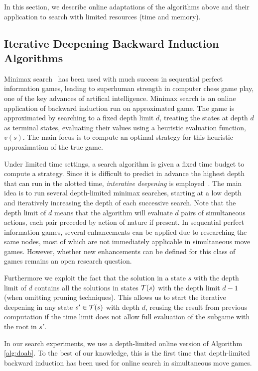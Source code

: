 
In this section, we describe online adaptations of the algorithms above and their application 
to search with limited resources (time and memory). 

\subsection{Iterative Deepening Backward Induction Algorithms} \label{sec:idbi}

Minimax search~\cite{AIbook} has been used with much success in sequential perfect information games, 
leading to superhuman strength in computer chess game play, one of the key advances of artifical 
intelligence. 
Minimax search is an online application of backward induction run on approximated game. 
The game is approximated by searching to a fixed depth limit $d$, treating the states at depth $d$
as terminal states, evaluating their values using a heuristic evaluation function, $v(s)$. 
The main focus is to compute an optimal strategy for this heuristic approximation of the true game. 

Under limited time settings, a search algorithm is given a fixed time budget to compute a strategy. 
Since it is difficult to predict in advance the highest depth that can run in the alotted time, 
{\it interative deepening} is employed~\cite{Marsland83}. The main idea is to run several depth-limited 
minimax searches, starting at a low depth and iteratively increasing the depth of each successive search. Note that the depth limit of $d$ means that the algorithm will evaluate $d$ pairs of simultaneous actions, each pair preceded by action of nature if present.  
In sequential perfect information games, several enhancements can be applied due to researching the same 
nodes, most of which are not immediately applicable in simultaneous move games. However, whether new 
enhancements can be defined for this class of games remains an open research question. 

Furthermore we exploit the fact that the solution in a state $s$ with the depth limit of $d$ contains all the solutions in states $\mathcal{T}(s)$ with the depth limit $d - 1$ (when omitting pruning techniques). This allows us to start the iterative deepening in any state $s' \in \mathcal{T}(s)$ with depth $d$, reusing the result from previous computation if the time limit does not allow full evaluation of the subgame with the root in $s'$. 

In our search experiments, we use a depth-limited online version of Algorithm \ref{alg:doab}. To the 
best of our knowledge, this is the first time that depth-limited backward induction has been used for 
online search in simultaneous move games. 






